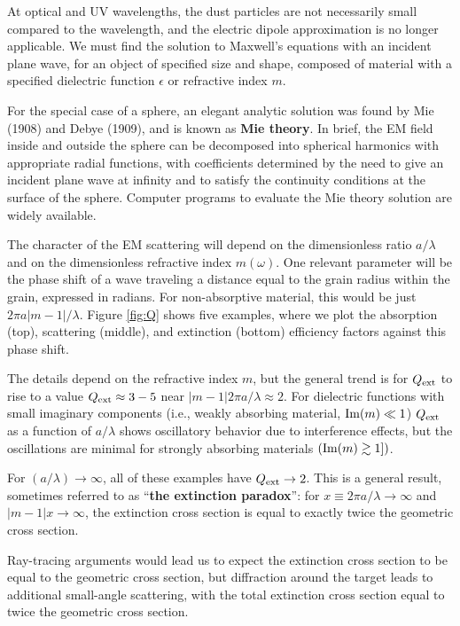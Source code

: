 \documentclass[a4paper,10pt]{article}
\begin{document}
{\noindent}At optical and UV wavelengths, the dust particles are not necessarily small compared to the wavelength, and the electric dipole approximation is no longer applicable. We must find the solution to Maxwell's equations with an incident plane wave, for an object of specified size and shape, composed of material with a specified dielectric function $\epsilon$ or refractive index $m$.

{\noindent}For the special case of a sphere, an elegant analytic solution was found by Mie (1908) and Debye (1909), and is known as \textbf{Mie theory}. In brief, the EM field inside and outside the sphere can be decomposed into spherical harmonics with appropriate radial functions, with coefficients determined by the need to give an incident plane wave at infinity and to satisfy the continuity conditions at the surface of the sphere. Computer programs to evaluate the Mie theory solution are widely available.

{\noindent}The character of the EM scattering will depend on the dimensionless ratio $a/\lambda$ and on the dimensionless refractive index $m(\omega)$. One relevant parameter will be the phase shift of a wave traveling a distance equal to the grain radius within the grain, expressed in radians. For non-absorptive material, this would be just $2\pi a|m-1|/\lambda$. Figure \ref{fig:Q} shows five examples, where we plot the absorption (top), scattering (middle), and extinction (bottom) efficiency factors against this phase shift.

{\noindent}The details depend on the refractive index $m$, but the general trend is for $Q_{\rm ext}$ to rise to a value $Q_{\rm ext}\approx3-5$ near $|m-1|2\pi a/\lambda\approx2$. For dielectric functions with small imaginary components (i.e., weakly absorbing material, ${\rm Im}(m)\ll1$) $Q_{\rm ext}$ as a function of $a/\lambda$ shows oscillatory behavior due to interference effects, but the oscillations are minimal for strongly absorbing materials $({\rm Im}(m)\gtrsim1])$.

{\noindent}For $(a/\lambda)\rightarrow\infty$, all of these examples have $Q_{\rm ext}\rightarrow2$. This is a general result, sometimes referred to as ``\textbf{the extinction paradox}'': for $x\equiv2\pi a/\lambda\rightarrow\infty$ and $|m-1|x\rightarrow\infty$, the extinction cross section is equal to exactly twice the geometric cross section.

{\noindent}Ray-tracing arguments would lead us to expect the extinction cross section to be equal to the geometric cross section, but diffraction around the target leads to additional small-angle scattering, with the total extinction cross section equal to twice the geometric cross section.
\end{document}
